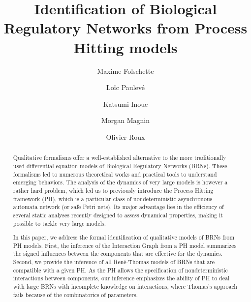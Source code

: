 \documentclass[preprint]{elsarticle}
\def\modMF#1{\textcolor{teal}{#1}}
\def\modLP#1{\textcolor{magenta}{#1}}
\def\modMM#1{\textcolor{blue}{#1}}
\def\modOR#1{\textcolor{olive}{#1}}
\def\modMF#1{#1} \def\modLP#1{#1} \def\modMM#1{#1} \def\modOR#1{#1}
\begin{document}
\begin{frontmatter}

\title{\modLP{Identification of} Biological Regulatory Networks from Process Hitting models}

\author[irccyn,nii]{Maxime Folschette}
\author[lri]{Lo\"ic Paulev\'e}
\author[nii]{Katsumi Inoue}
\author[irccyn,nii]{Morgan Magnin}
\author[irccyn]{Olivier Roux}

\address[irccyn]{LUNAM Universit\'e, \'Ecole Centrale de Nantes, IRCCyN UMR CNRS 6597\\
(Institut de Recherche en Communications et Cybern\'etique de Nantes)\\
1 rue de la No\"e - B.P. 92101 - 44321 Nantes Cedex 3, France.}
\address[nii]{National Institute of Informatics,\\
2-1-2, Hitotsubashi, Chiyoda-ku, Tokyo 101-8430, Japan.}
\address[lri]{CNRS, Laboratoire de Recherche en Informatique UMR CNRS 8623\\
Universit\'e Paris-Sud, 91405 Orsay Cedex, France}


\begin{abstract}
\modOR{Qualitative formalisms offer a well-established alternative to the more traditionally used differential equation models of Biological Regulatory Networks (BRNs). These formalisms led to numerous theoretical works and practical tools to understand emerging behaviors.} \modMM{The analysis of the dynamics of very large models is however a rather hard problem, which led us to previously introduce} \modMF{the Process Hitting framework (PH),} \modMM{which} \modLP{is a particular class of nondeterministic asynchronous automata
network (or safe Petri nets).} \modMM{Its major advantage lies in the efficiency of several static analyses recently designed to assess dynamical properties, making it possible to tackle very large models.}

\modLP{In this paper, we address the formal identification of qualitative
models of BRNs from PH models.}
First, the inference of the Interaction Graph from a PH model
\modLP{summarizes the signed influences between the components} that are effective for the dynamics.
Second, we provide the inference of all Ren\'e-Thomas models of BRNs 
that are compatible with a given PH.
As the PH allows the specification of nondeterministic interactions between
components, our inference emphasizes the ability of PH to deal with large BRNs with incomplete knowledge
on interactions, where Thomas's approach fails because of the combinatorics of parameters.


\end{abstract}
\end{frontmatter}
\end{document}
